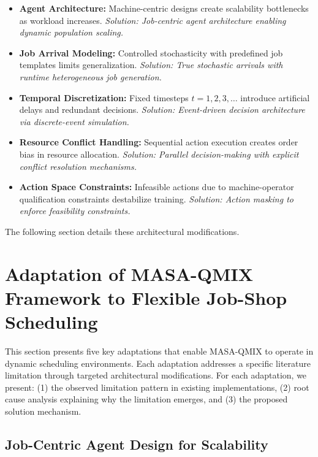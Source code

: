 \begin{itemize}
\item \textbf{Agent Architecture:} Machine-centric designs create scalability bottlenecks as workload increases. \textit{Solution: Job-centric agent architecture enabling dynamic population scaling.}

\item \textbf{Job Arrival Modeling:} Controlled stochasticity with predefined job templates limits generalization. \textit{Solution: True stochastic arrivals with runtime heterogeneous job generation.}

\item \textbf{Temporal Discretization:} Fixed timesteps \( t = 1, 2, 3, \ldots \) introduce artificial delays and redundant decisions. \textit{Solution: Event-driven decision architecture via discrete-event simulation.}

\item \textbf{Resource Conflict Handling:} Sequential action execution creates order bias in resource allocation. \textit{Solution: Parallel decision-making with explicit conflict resolution mechanisms.}

\item \textbf{Action Space Constraints:} Infeasible actions due to machine-operator qualification constraints destabilize training. \textit{Solution: Action masking to enforce feasibility constraints.}
\end{itemize}

The following section details these architectural modifications.


\section{Adaptation of MASA-QMIX Framework to Flexible Job-Shop Scheduling}
\label{sec:adaptations}

This section presents five key adaptations that enable MASA-QMIX to operate in dynamic scheduling environments. Each adaptation addresses a specific literature limitation through targeted architectural modifications. For each adaptation, we present: (1) the observed limitation pattern in existing implementations, (2) root cause analysis explaining why the limitation emerges, and (3) the proposed solution mechanism.


\subsection{Job-Centric Agent Design for Scalability}
\label{sec:scalability_adaptation}

